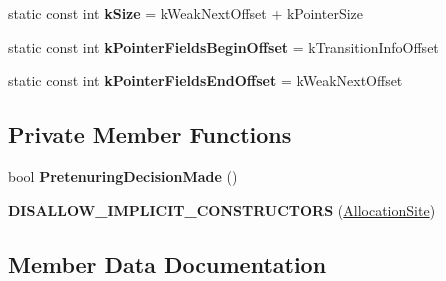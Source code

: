 \begin{DoxyCompactItemize}
\item 
static const int {\bfseries k\+Size} = k\+Weak\+Next\+Offset + k\+Pointer\+Size\hypertarget{classv8_1_1internal_1_1_allocation_site_a8563fdab6231c9e2d1346a3d2a726d9c}{}\label{classv8_1_1internal_1_1_allocation_site_a8563fdab6231c9e2d1346a3d2a726d9c}

\item 
static const int {\bfseries k\+Pointer\+Fields\+Begin\+Offset} = k\+Transition\+Info\+Offset\hypertarget{classv8_1_1internal_1_1_allocation_site_a0a718e12a1ec05d53dde6dd61835db66}{}\label{classv8_1_1internal_1_1_allocation_site_a0a718e12a1ec05d53dde6dd61835db66}

\item 
static const int {\bfseries k\+Pointer\+Fields\+End\+Offset} = k\+Weak\+Next\+Offset\hypertarget{classv8_1_1internal_1_1_allocation_site_a8f06e59d25cc4c6946f902d3c79ebbc5}{}\label{classv8_1_1internal_1_1_allocation_site_a8f06e59d25cc4c6946f902d3c79ebbc5}

\end{DoxyCompactItemize}
\subsection*{Private Member Functions}
\begin{DoxyCompactItemize}
\item 
bool {\bfseries Pretenuring\+Decision\+Made} ()\hypertarget{classv8_1_1internal_1_1_allocation_site_ae5b6a0858a7a3a697a5cbf1e44307d99}{}\label{classv8_1_1internal_1_1_allocation_site_ae5b6a0858a7a3a697a5cbf1e44307d99}

\item 
{\bfseries D\+I\+S\+A\+L\+L\+O\+W\+\_\+\+I\+M\+P\+L\+I\+C\+I\+T\+\_\+\+C\+O\+N\+S\+T\+R\+U\+C\+T\+O\+RS} (\hyperlink{classv8_1_1internal_1_1_allocation_site}{Allocation\+Site})\hypertarget{classv8_1_1internal_1_1_allocation_site_aabf4ae202f82927bd29f0f70d6d3f2fd}{}\label{classv8_1_1internal_1_1_allocation_site_aabf4ae202f82927bd29f0f70d6d3f2fd}

\end{DoxyCompactItemize}


\subsection{Member Data Documentation}
